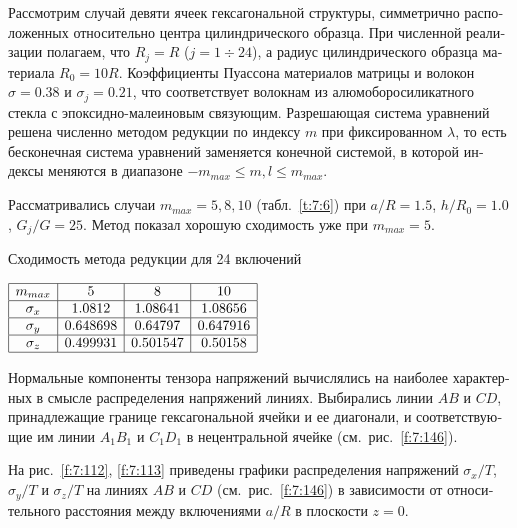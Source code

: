 \begin{russian}
Рассмотрим случай девяти ячеек гексагональной структуры, симметрично расположенных относительно центра цилиндрического образца. При численной реализации полагаем, что $R_j=R$ ($j=1\div 24$), а радиус цилиндрического образца материала $R_0=10R$. Коэффициенты Пуассона материалов матрицы и волокон $\sigma=0.38$ и $\sigma_j=0.21$, что соответствует волокнам из алюмоборосиликатного стекла с эпоксидно-малеиновым связующим. Разрешающая система уравнений решена численно методом редукции по индексу $m$ при фиксированном $\lambda$, то есть бесконечная система уравнений заменяется конечной системой, в которой индексы меняются в диапазоне $-m_{max}\le m,l\le m_{max}$.


Рассматривались случаи $m_{max}=5,8,10$ (табл.~\ref{t:7:6}) при $a/R=1.5$, $h/R_0=1.0$, $G_j/G=25$. Метод показал хорошую сходимость уже при $m_{max}=5$.

\begin{table}[h!]
\caption{Сходимость метода редукции для 24 включений}
\centering
$
\begin{array}{|c|c|c|c|}
\hline
m_{max} & 5 & 8 & 10 \\
\hline
\sigma_x & 1.0812 & 1.08641 & 1.08656 \\
\hline
\sigma_y & 0.648698 & 0.64797 & 0.647916 \\
\hline
\sigma_z & 0.499931 & 0.501547 & 0.50158 \\
\hline
\end{array}
$
\label{t:7:6}
\end{table}

Нормальные компоненты тензора напряжений вычислялись на наиболее характерных в смысле распределения напряжений линиях. Выбирались линии $AB$ и $CD$, принадлежащие границе гексагональной ячейки и ее диагонали, и соответствующие им линии $A_1B_1$ и $C_1D_1$ в нецентральной ячейке (см.~рис.~\ref{f:7:146}).

На рис.~\ref{f:7:112}, \ref{f:7:113} приведены графики распределения напряжений $\sigma_x/T$, $\sigma_y/T$ и $\sigma_z/T$ на линиях $AB$ и $CD$ (см.~рис.~\ref{f:7:146}) в зависимости от относительного расстояния между включениями $a/R$ в плоскости $z=0$.


\end{russian}
